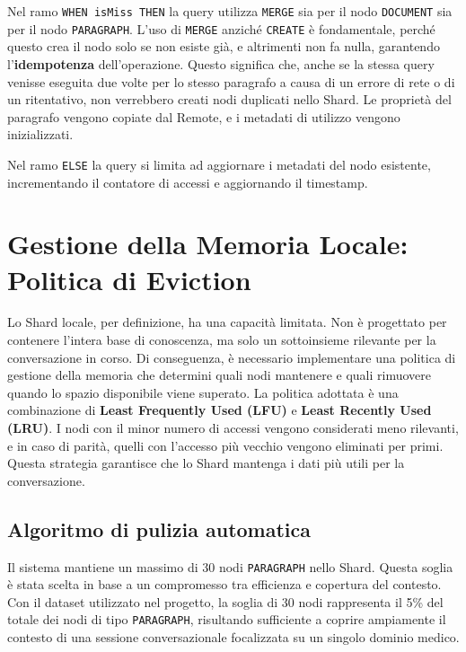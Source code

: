 Nel ramo \texttt{WHEN isMiss THEN} la query utilizza \texttt{MERGE} sia per il nodo \texttt{DOCUMENT} sia per il nodo \texttt{PARAGRAPH}. L'uso di \texttt{MERGE} anziché \texttt{CREATE} è fondamentale, perché questo crea il nodo solo se non esiste già, e altrimenti non fa nulla, garantendo l'\textbf{idempotenza} dell'operazione. Questo significa che, anche se la stessa query venisse eseguita due volte per lo stesso paragrafo a causa di un errore di rete o di un ritentativo, non verrebbero creati nodi duplicati nello Shard. Le proprietà del paragrafo vengono copiate dal Remote, e i metadati di utilizzo vengono inizializzati.

Nel ramo \texttt{ELSE} la query si limita ad aggiornare i metadati del nodo esistente, incrementando il contatore di accessi e aggiornando il timestamp.

\section{Gestione della Memoria Locale: Politica di Eviction}

Lo Shard locale, per definizione, ha una capacità limitata. Non è progettato per contenere l'intera base di conoscenza, ma solo un sottoinsieme rilevante per la conversazione in corso. Di conseguenza, è necessario implementare una politica di gestione della memoria che determini quali nodi mantenere e quali rimuovere quando lo spazio disponibile viene superato. La politica adottata è una combinazione di \textbf{Least Frequently Used (LFU)} e \textbf{Least Recently Used (LRU)}. I nodi con il minor numero di accessi vengono considerati meno rilevanti, e in caso di parità, quelli con l'accesso più vecchio vengono eliminati per primi. Questa strategia garantisce che lo Shard mantenga i dati più utili per la conversazione.

\subsection{Algoritmo di pulizia automatica}

Il sistema mantiene un massimo di 30 nodi \texttt{PARAGRAPH} nello Shard. Questa soglia è stata scelta in base a un compromesso tra efficienza e copertura del contesto. Con il dataset utilizzato nel progetto, la soglia di 30 nodi rappresenta il 5\% del totale dei nodi di tipo \texttt{PARAGRAPH}, risultando sufficiente a coprire ampiamente il contesto di una sessione conversazionale focalizzata su un singolo dominio medico.

